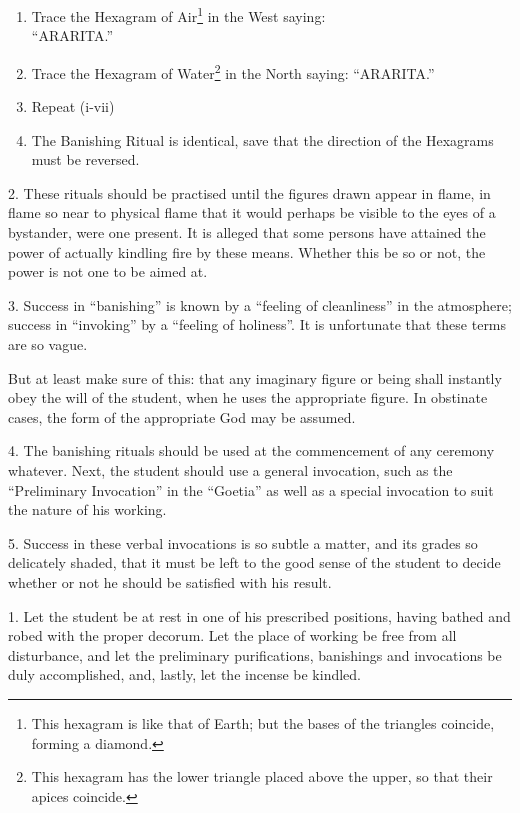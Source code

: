 \begin{enumerate}[label=(\textit{\Roman*})]
\item Trace the Hexagram of Air\footnote{This hexagram is like that of Earth; but the bases of the triangles coincide, forming a diamond.} in the West saying: \\ \enquote{ARARITA.}
\item Trace the Hexagram of Water\footnote{This hexagram has the lower triangle placed above the upper, so that their apices coincide.} in the North saying: \enquote{ARARITA.}
\item Repeat (i-vii)
\item[] The Banishing Ritual is identical, save that the direction of the Hexagrams must be reversed.
\end{enumerate}


2. These rituals should be practised until the figures drawn appear in flame, in flame so near to physical flame that it would perhaps be visible to the eyes of a bystander, were one present. It is alleged that some persons have attained the power of actually kindling fire by these means. Whether this be so or not, the power is not one to be aimed at.

3. Success in \enquote{banishing} is known by a \enquote{feeling of cleanliness} in the atmosphere; success in \enquote{invoking} by a \enquote{feeling of holiness}. It is unfortunate that these terms are so vague.

But at least make sure of this: that any imaginary figure or being shall instantly obey the will of the student, when he uses the appropriate figure. In obstinate cases, the form of the appropriate God may be assumed.

4. The banishing rituals should be used at the commencement of any ceremony whatever. Next, the student should use a general invocation, such as the \enquote{Preliminary Invocation} in the \enquote{Goetia} as well as a special invocation to suit the nature of his working.

5. Success in these verbal invocations is so subtle a matter, and its grades so delicately shaded, that it must be left to the good sense of the student to decide whether or not he should be satisfied with his result.



1. Let the student be at rest in one of his prescribed positions, having bathed and robed with the proper decorum. Let the place of working be free from all disturbance, and let the preliminary purifications, banishings and invocations be duly accomplished, and, lastly, let the incense be kindled.

